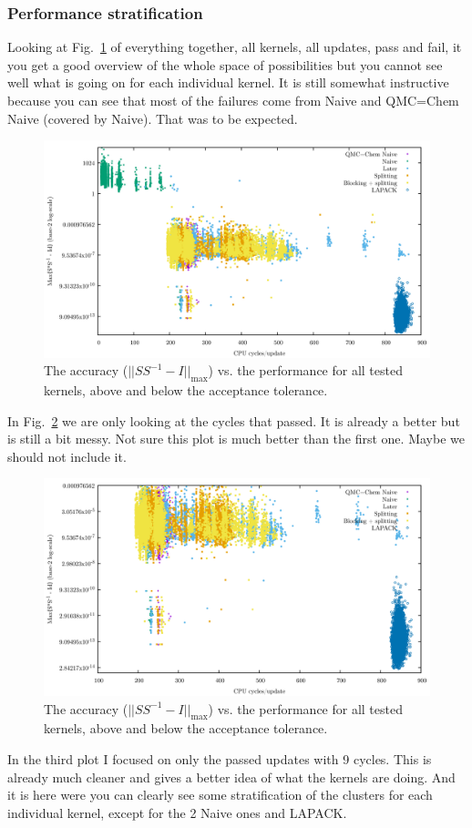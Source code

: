 \documentclass[11pt]{article}
\numberwithin{figure}{section}
\numberwithin{table}{section}
\begin{document}
		\subsubsection{Performance stratification}
		
		  Looking at Fig.~\ref{fig:pareto_all} of everything together, all kernels, all updates, pass and fail, it you get a good overview of the whole space of possibilities but you cannot see well what is going on for each individual kernel. It is still somewhat instructive because you can see that most of the failures come from Naive and QMC=Chem Naive (covered by Naive). That was to be expected.\\
		\begin{figure}[H]
			\includegraphics[width=0.5\linewidth]{pareto_pass_fail_all.png}	
			\caption{The accuracy ($||SS^{-1}-I||_\mathrm{max}$) vs. the performance for all tested kernels, above and below the acceptance tolerance.}
			\label{fig:pareto_all}
		\end{figure}
		
        In Fig.~\ref{fig:pareto_pass} we are only looking at the cycles that passed. It is already a better but is still a bit messy. Not sure this plot is much better than the first one. Maybe we should not include it.\\
		\begin{figure}[H]
			\includegraphics[width=0.5\linewidth]{pareto_pass_all.png}	
			\caption{The accuracy ($||SS^{-1}-I||_\mathrm{max}$) vs. the performance for all tested kernels, above and below the acceptance tolerance.}
			\label{fig:pareto_pass}
		\end{figure}
		
        In the third plot I focused on only the passed updates with 9 cycles. This is already much cleaner and gives a better idea of what the kernels are doing. And it is here were you can clearly see some stratification of the clusters for each individual kernel, except for the 2 Naive ones and LAPACK.\\
\end{document}
